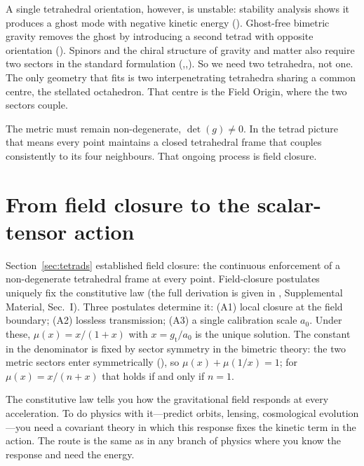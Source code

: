 \documentclass[aps,twocolumn,amsmath,amssymb,reprint,nofootinbib,nobalancelastpage]{revtex4-2}
\begin{document}
A single tetrahedral orientation, however, is unstable: stability analysis shows it produces a ghost mode with negative kinetic energy (\cite{alexander2014}). Ghost-free bimetric gravity removes the ghost by introducing a second tetrad with opposite orientation (\cite{hassan2012}). Spinors and the chiral structure of gravity and matter also require two sectors in the standard formulation (\cite{weinberg1995},\cite{geroch1968},\cite{ashtekar1986}). So we need two tetrahedra, not one. The only geometry that fits is two interpenetrating tetrahedra sharing a common centre, the stellated octahedron. That centre is the Field Origin, where the two sectors couple.

The metric must remain non-degenerate, $\det(g) \neq 0$. In the tetrad picture that means every point maintains a closed tetrahedral frame that couples consistently to its four neighbours. That ongoing process is field closure.

\section{From field closure to the scalar-tensor action}
\label{sec:action}

Section~\ref{sec:tetrads} established field closure: the continuous enforcement of a non-degenerate tetrahedral frame at every point. Field-closure postulates uniquely fix the constitutive law (the full derivation is given in \cite{Nelson2026}, Supplemental Material, Sec.~I). Three postulates determine it: (A1) local closure at the field boundary; (A2) lossless transmission; (A3) a single calibration scale $a_0$. Under these, $\mu(x) = x/(1+x)$ with $x = g_{\mathrm{t}}/a_0$ is the unique solution. The constant in the denominator is fixed by sector symmetry in the bimetric theory: the two metric sectors enter symmetrically (\cite{hassan2012}), so $\mu(x) + \mu(1/x) = 1$; for $\mu(x) = x/(n+x)$ that holds if and only if $n = 1$.

The constitutive law tells you how the gravitational field responds at every acceleration. To do physics with it---predict orbits, lensing, cosmological evolution---you need a covariant theory in which this response fixes the kinetic term in the action. The route is the same as in any branch of physics where you know the response and need the energy.
\end{document}
